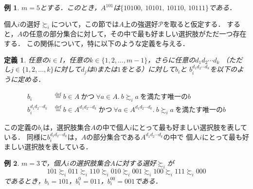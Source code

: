 \documentclass[dvipdfmx]{jsarticle}
\newtheorem{definition}{定義}
\newtheorem{example}{例}
\begin{document}
\begin{example}
  $m=5$とする．このとき，$A^{101}$は$\{10100,\ 10101,\ 10110,\ 10111\}$である．
\end{example}

個人$i$の選好$\succsim_i$について，この節では$A$上の強選好$\mathcal{P}$を取ると仮定する．
すると，$A$の任意の部分集合に対して，その中で最も好ましい選択肢がただ一つ存在する．
この関係について，特に以下のような定義を与える．

\begin{definition}\label{def:最上位選択肢}
  任意の$i \in I$，任意の$k \in \{1,2,\ldots,m-1\}$，さらに任意の$d_{1}d_{2}\cdots d_{k}$
  （ただし$j \in \{1,2,\ldots,k \}$に対して$d_j$は$0$または$1$をとる）に対して$b_{i}$と
  $b_{i}^{d_{1}d_{2}\cdots d_{k}}$を以下のように定める．

  \begin{align*}
    b_i &\stackrel{\mathrm{def}}{=} b \in A\ \text{かつ}\ \forall a \in A. \ b \succsim_i a\
    \text{を満たす唯一の}b \\
    b_{i}^{d_{1}d_{2}\cdots d_{k}} &\stackrel{\mathrm{def}}{=}
    b \in A^{d_{1}d_{2}\cdots d_{k}} \ \text{かつ}\ \forall a \in A^{d_{1}d_{2}\cdots d_{k}}.
    \ b \succsim_i a\ \text{を満たす唯一の}b
  \end{align*}
\end{definition}

この定義の$b_i$は，選択肢集合$A$の中で個人$i$にとって最も好ましい選択肢を表している．
同様に$b_{i}^{d_{1}d_{2}\cdots d_{k}}$は，$A$の部分集合である$A^{d_{1}d_{2}\cdots d_{k}}$の中で
個人$i$にとって最も好ましい選択肢を表している．

\begin{example}
  $m=3$で，個人$i$の選択肢集合$A$に対する選好$\succsim_i$が
  \[
    101 \succsim_i 011 \succsim_i 110 \succsim_i 010 \succsim_i 001 \succsim_i 100
    \succsim_i 111 \succsim_i 000
  \]
  であるとき，$b_i = 101$，$b_{i}^{0} = 011$，$b_{i}^{00} = 001$である．
\end{example}
\end{document}
